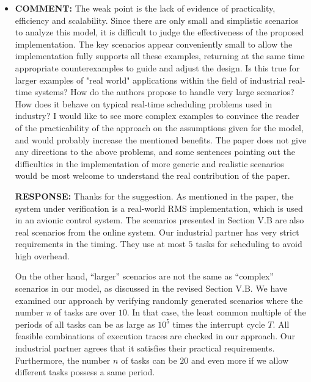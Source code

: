\documentclass[10pt,journal]{IEEEtran}
\newcommand{\ANSWER}{{\bf RESPONSE: }}
\newcommand{\COMMENT}{{\bf COMMENT: }}
\begin{document}
\begin{itemize}
\item
\COMMENT The weak point is the lack of evidence of practicality,
efficiency and scalability. Since there are only small and simplistic
scenarios to analyze this model, it is difficult to judge the
effectiveness of the proposed implementation. The key scenarios appear
conveniently small to allow the implementation fully supports all
these examples, returning at the same time appropriate counterexamples
to guide and adjust the design. Is this true for larger examples of
"real world" applications within the field of industrial real-time
systems? How do the authors propose to handle very large scenarios?
How does it behave on typical real-time scheduling problems used in
industry? I would like to see more complex examples to convince the
reader of the practicability of the approach on the assumptions given
for the model, and would probably increase the mentioned benefits. The
paper does not give any directions to the above problems, and some
sentences pointing out the difficulties in the implementation of more
generic and realistic scenarios would be most welcome to understand
the real contribution of the paper.

\ANSWER Thanks for the suggestion. As mentioned in the paper, the
system under verification is a real-world RMS implementation, which is
used in an avionic control system. The scenarios presented in Section
V.B are also real scenarios from the online system. Our industrial
partner has very strict requirements in the timing. They use at most
$5$ tasks for scheduling to avoid high overhead.

On the other hand, ``larger'' scenarios are not the same as
``complex'' scenarios in our model, as discussed in the revised
Section V.B. We have examined our approach by verifying randomly
generated scenarios where the number $n$ of tasks are over $10$. In
that case, the least common multiple of the periods of all tasks can
be as large as $10^5$ times the interrupt cycle $T$. All feasible
combinations of execution traces are checked in our approach. Our
industrial partner agrees that it satisfies their practical
requirements. Furthermore, the number $n$ of tasks can be $20$ and
even more if we allow different tasks possess a same period.


\end{itemize}
\end{document}
